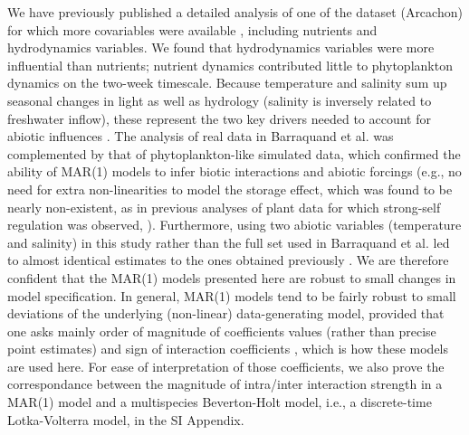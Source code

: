 \documentclass[9pt,twocolumn,twoside,lineno]{pnas-new}
\begin{document}
{We have previously published a detailed analysis of one of the dataset
(Arcachon) for which more covariables were available \cite{barraquand_coastal_2018},
including nutrients and hydrodynamics variables. We found that hydrodynamics
variables were more influential than nutrients; nutrient dynamics
contributed little to phytoplankton dynamics on the two-week timescale.
Because temperature and salinity sum up seasonal changes in light
as well as hydrology (salinity is inversely related to freshwater
inflow), these represent the two key drivers needed to account for
abiotic influences \cite{scheef_inferring_2013}. The analysis
of real data in Barraquand et al. \cite{barraquand_coastal_2018}
was complemented by that of phytoplankton-like simulated data, which
confirmed the ability of MAR(1) models to infer biotic interactions
and abiotic forcings (e.g., no need for extra non-linearities to model
the storage effect, which was found to be nearly non-existent, as
in previous analyses of plant data for which strong-self regulation
was observed, ).
Furthermore, using two abiotic variables (temperature and salinity)
in this study rather than the full set used in Barraquand et al. \cite{barraquand_coastal_2018}
led to almost identical estimates to the ones obtained previously \cite{barraquand_coastal_2018}.
We are therefore confident that the MAR(1) models presented here are
robust to small changes in model specification. In general, MAR(1)
models tend to be fairly robust to small deviations of the underlying
(non-linear) data-generating model, provided that one asks mainly
order of magnitude of coefficients values (rather than precise point
estimates) and sign of interaction coefficients \cite{certain_how_2018},
which is how these models are used here. For ease of interpretation
of those coefficients, we also prove the correspondance between the
magnitude of intra/inter interaction strength in a MAR(1) model and
a multispecies Beverton-Holt model, i.e., a discrete-time Lotka-Volterra
model, in the SI Appendix.

}
\end{document}
